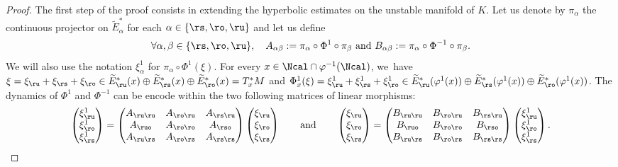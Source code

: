\begin{proof}
The first step of the proof consists in extending the hyperbolic estimates on the unstable manifold of $K$. Let us denote by $\pi_{\alpha}$ the continuous projector on $\widetilde{E}_{\alpha}^*$ for each $\alpha \in \{\rs,\ro,\ru\}$ and let us define
\[
\forall \alpha, \beta \in \{\rs,\ro,\ru\}, \quad A_{\alpha \beta}:= \pi_{\alpha} \circ \Phi^1 \circ \pi_{\beta} \text{ and } B_{\alpha \beta}:= \pi_{\alpha} \circ \Phi^{-1} \circ \pi_{\beta}.
\]
We will also use the notation $\xi_{\alpha}^1$ for $\pi_{\alpha} \circ \Phi^1 (\xi)$. For every $x \in \Ncal \cap \varphi^{-1}(\Ncal) $, we~have $\xi = \xi_\ru + \xi_\rs + \xi_\ro \in \widetilde{E}_\ru^* (x) \oplus \widetilde{E}_\rs^* (x) \oplus \widetilde{E}_\ro^* (x) = T_x^* M$ and $\Phi_x^1 (\xi) = \xi_\ru^1 + \xi_\rs^1 + \xi_\ro^1 \in \widetilde{E}_\ru^* (\varphi^1 (x)) \oplus \widetilde{E}_\rs^* (\varphi^1 (x)) \oplus \widetilde{E}_\ro^* (\varphi^1 (x))$. The dynamics of $\Phi^1$ and $\Phi^{-1}$ can be encode within the two following matrices of linear morphisms:
\[
\begin{pmatrix}\xi_\ru^1 \\ \xi_\ro^1 \\ \xi_\rs^1 \end{pmatrix}
= \begin{pmatrix}
A_{\ru\ru} & A_{\ro\ru} & A_{\rs\ru} \\
A_{\ruo} & A_{\ro\ro} & A_{\rso} \\
A_{\ru\rs} & A_{\ro\rs} & A_{\rs\rs}
\end{pmatrix}
\begin{pmatrix}\xi_\ru \\ \xi_\ro \\ \xi_\rs \end{pmatrix}
\qquad \text{and} \qquad \begin{pmatrix}\xi_\ru \\ \xi_\ro \\ \xi_\rs \end{pmatrix}
= \begin{pmatrix}
B_{\ru\ru} & B_{\ro\ru} & B_{\rs\ru} \\
B_{\ruo} & B_{\ro\ro} & B_{\rso} \\
B_{\ru\rs} & B_{\ro\rs} & B_{\rs\rs}
\end{pmatrix}
\begin{pmatrix}\xi_\ru^1 \\ \xi_\ro^1 \\ \xi_\rs^1 \end{pmatrix}.
\]
\end{proof}

